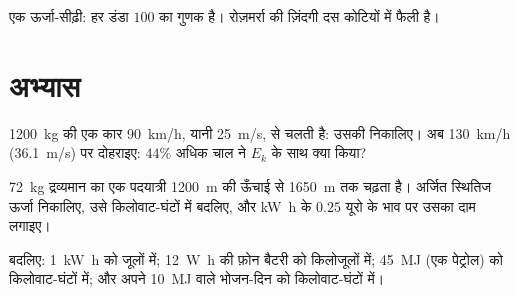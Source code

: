 \begin{omfigure}

{\small एक ऊर्जा-सीढ़ी: हर डंडा $100$ का गुणक है। रोज़मर्रा
की ज़िंदगी दस कोटियों में फैली है।}
\end{omfigure}

\section{अभ्यास}

\begin{exercise}[$\star$]\label{exo:g10:energy-conservation:1}
\qty{1200}{kg} की एक कार \qty{90}{km/h}, यानी \qty{25}{m/s}, से चलती है: उसकी
 निकालिए। अब \qty{130}{km/h} (\qty{36.1}{m/s}) पर दोहराइए: $44\%$
अधिक चाल ने $E_k$ के साथ क्या किया?
\end{exercise}

\begin{exercise}[$\star$]\label{exo:g10:energy-conservation:2}
\qty{72}{kg} द्रव्यमान का एक पदयात्री \qty{1200}{m} की ऊँचाई से \qty{1650}{m} तक चढ़ता
है। अर्जित स्थितिज ऊर्जा निकालिए, उसे
किलोवाट-घंटों में बदलिए, और \unit{kW.h} के $0.25$ यूरो के भाव पर
उसका दाम लगाइए।
\end{exercise}

\begin{exercise}[$\star$]\label{exo:g10:energy-conservation:3}
बदलिए: \qty{1}{kW.h} को जूलों में; \qty{12}{W.h} की फ़ोन बैटरी को
किलोजूलों में; \qty{45}{MJ} (एक  पेट्रोल) को
किलोवाट-घंटों में; और अपने \qty{10}{MJ} वाले भोजन-दिन को
किलोवाट-घंटों में।
\end{exercise}

